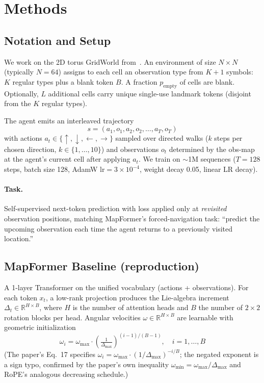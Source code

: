 \section{Methods}
\label{sec:methods}

\subsection{Notation and Setup}

We work on the 2D torus GridWorld from~\citet{rambaud2025mapformer}. An
environment of size $N \times N$ (typically $N{=}64$) assigns to each cell
an observation type from $K + 1$ symbols: $K$ regular types plus a blank
token $B$. A fraction $p_\mathrm{empty}$ of cells are blank. Optionally,
$L$ additional cells carry unique single-use landmark tokens (disjoint
from the $K$ regular types).

The agent emits an interleaved trajectory
\begin{equation}
  s = (a_1, o_1, a_2, o_2, \ldots, a_T, o_T)
\end{equation}
with actions $a_t \in \{\uparrow,\downarrow,\leftarrow,\rightarrow\}$
sampled over directed walks ($k$ steps per chosen direction,
$k \in \{1,\ldots,10\}$) and observations $o_t$ determined by the
obs-map at the agent's current cell after applying $a_t$. We train on
$\sim$1M sequences ($T{=}128$ steps, batch size 128, AdamW
$\mathrm{lr}{=}3\!\times\!10^{-4}$, weight decay 0.05, linear LR decay).

\paragraph{Task.} Self-supervised next-token prediction with loss applied
only at \emph{revisited} observation positions, matching MapFormer's
forced-navigation task: ``predict the upcoming observation each time the
agent returns to a previously visited location.''

\subsection{MapFormer Baseline (reproduction)}

A 1-layer Transformer on the unified vocabulary (actions + observations).
For each token $x_t$, a low-rank projection produces the Lie-algebra
increment $\Delta_t \in \mathbb{R}^{H \times B}$, where $H$ is the number
of attention heads and $B$ the number of $2{\times}2$ rotation blocks per
head. Angular velocities $\omega \in \mathbb{R}^{H \times B}$ are
learnable with geometric initialization
\begin{equation}
  \omega_i = \omega_{\max} \cdot \left( \tfrac{1}{\Delta_{\max}} \right)^{(i-1)/(B-1)}, \quad i = 1, \ldots, B
\end{equation}
(The paper's Eq.~17 specifies
$\omega_i = \omega_{\max} \cdot (1/\Delta_{\max})^{-i/B}$; the negated
exponent is a sign typo, confirmed by the paper's own inequality
$\omega_\mathrm{min} = \omega_{\max}/\Delta_{\max}$ and RoPE's analogous
decreasing schedule.)

